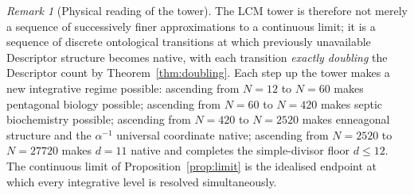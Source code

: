 \documentclass[11pt,a4paper]{article}
\theoremstyle{definition}
\theoremstyle{remark}
\newtheorem{remark}[theorem]{Remark}
\begin{document}
\begin{remark}[Physical reading of the tower]
The LCM tower is therefore not merely a sequence of successively finer approximations to a continuous limit; it is a sequence of discrete ontological transitions at which previously unavailable Descriptor structure becomes native, with each transition \emph{exactly doubling} the Descriptor count by Theorem~\ref{thm:doubling}. Each step up the tower makes a new integrative regime possible: ascending from $N=12$ to $N=60$ makes pentagonal biology possible; ascending from $N=60$ to $N=420$ makes septic biochemistry possible; ascending from $N=420$ to $N=2520$ makes enneagonal structure and the $\alpha^{-1}$ universal coordinate native; ascending from $N=2520$ to $N=27720$ makes $d=11$ native and completes the simple-divisor floor $d\le 12$. The continuous limit of Proposition~\ref{prop:limit} is the idealised endpoint at which every integrative level is resolved simultaneously.
\end{remark}
\end{document}
